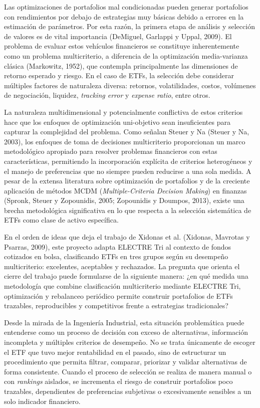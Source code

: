 \documentclass[12pt,letterpaper]{article}
\begin{document}
Las optimizaciones de portafolios mal condicionadas pueden generar portafolios con rendimientos por debajo de estrategias muy básicas debido a errores en la estimación de parámetros. Por esta razón, la primera etapa de análisis y selección de valores es de vital importancia (DeMiguel, Garlappi y Uppal, 2009). El problema de evaluar estos vehículos financieros se constituye inherentemente como un problema multicriterio, a diferencia de la optimización media-varianza clásica (Markowitz, 1952), que contempla principalmente las dimensiones de retorno esperado y riesgo. En el caso de ETFs, la selección debe considerar múltiples factores de naturaleza diversa: retornos, volatilidades, costos, volúmenes de negociación, liquidez, \textit{tracking error} y \textit{expense ratio}, entre otros.

La naturaleza multidimensional y potencialmente conflictiva de estos criterios hace que los enfoques de optimización uni-objetivo sean insuficientes para capturar la complejidad del problema. Como señalan Steuer y Na (Steuer y Na, 2003), los enfoques de toma de decisiones multicriterio proporcionan un marco metodológico apropiado para resolver problemas financieros con estas características, permitiendo la incorporación explícita de criterios heterogéneos y el manejo de preferencias que no siempre pueden reducirse a una sola medida. A pesar de la extensa literatura sobre optimización de portafolios y de la creciente aplicación de métodos MCDM (\textit{Multiple-Criteria Decision Making}) en finanzas (Spronk, Steuer y Zopounidis, 2005; Zopounidis y Doumpos, 2013), existe una brecha metodológica significativa en lo que respecta a la selección sistemática de ETFs como clase de activo específica.

En el orden de ideas que deja el trabajo de Xidonas et al. (Xidonas, Mavrotas y Psarras, 2009), este proyecto adapta ELECTRE Tri al contexto de fondos cotizados en bolsa, clasificando ETFs en tres grupos según su desempeño multicriterio: excelentes, aceptables y rechazados. La pregunta que orienta el cierre del trabajo puede formularse de la siguiente manera: ¿en qué medida una metodología que combine clasificación multicriterio mediante ELECTRE Tri, optimización y rebalanceo periódico permite construir portafolios de ETFs trazables, reproducibles y competitivos frente a estrategias tradicionales?



Desde la mirada de la Ingeniería Industrial, esta situación problemática puede entenderse como un proceso de decisión con exceso de alternativas, información incompleta y múltiples criterios de desempeño. No se trata únicamente de escoger el ETF que tuvo mejor rentabilidad en el pasado, sino de estructurar un procedimiento que permita filtrar, comparar, priorizar y validar alternativas de forma consistente. Cuando el proceso de selección se realiza de manera manual o con \textit{rankings} aislados, se incrementa el riesgo de construir portafolios poco trazables, dependientes de preferencias subjetivas o excesivamente sensibles a un solo indicador financiero.
\end{document}
